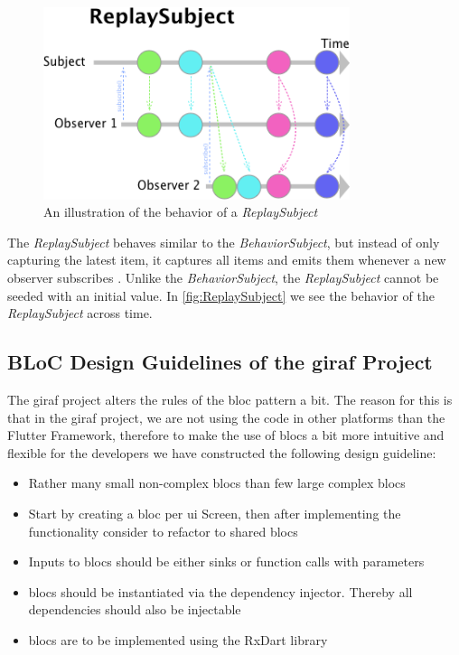 \begin{figure}[h]
    \centering
    \includegraphics[width=0.8\textwidth]{figures/ReplaySubject.png}
    \caption{An illustration of the behavior of a \textit{ReplaySubject}}
    \label{fig:ReplaySubject}
\end{figure}

The \textit{ReplaySubject} behaves similar to the \textit{BehaviorSubject}, but instead of only capturing the latest item, it captures all items and emits them whenever a new observer subscribes \cite{ReplaySubject}. Unlike the \textit{BehaviorSubject}, the \textit{ReplaySubject} cannot be seeded with an initial value. In \autoref{fig:ReplaySubject} we see the behavior of the \textit{ReplaySubject} across  time.

\subsection{BLoC Design Guidelines of the \gls{giraf} Project}

The \gls{giraf} project alters the rules of the \gls{bloc} pattern a bit. The reason for this is that in the \gls{giraf} project, we are not using the code in other platforms than the Flutter Framework, therefore to make the use of \glspl{bloc} a bit more intuitive and flexible for the developers we have constructed the following design guideline:

\begin{itemize}
  \item Rather many small non-complex \glspl{bloc} than few large complex \glspl{bloc}
  \item Start by creating a \gls{bloc} per \gls{ui} Screen, then after implementing the functionality consider to refactor to shared \glspl{bloc}
  \item Inputs to \glspl{bloc} should be either sinks or function calls with parameters
  \item \glspl{bloc} should be instantiated via the dependency injector. Thereby all dependencies should also be injectable
  \item \glspl{bloc} are to be implemented using the RxDart library
\end{itemize}


